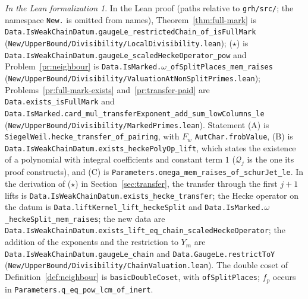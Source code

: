 \documentclass[reqno]{amsart}
\theoremstyle{plain}
\theoremstyle{definition}
\theoremstyle{remark}
\newtheorem*{leanremark}{In the Lean formalization}
\newcommand{\Qc}{\mathcal Q}
\newcommand{\tl}[1]{\texttt{#1}}
\begin{document}
\begin{leanremark}
\begin{sloppypar}
In the Lean proof \cite{GL} (paths relative to \tl{grh/src/}; the namespace \tl{New.} is omitted from names), Theorem~\ref{thm:full-mark} is \tl{Data.IsWeakChainDatum.\allowbreak gaugeLe\_\allowbreak restrictedChain\_\allowbreak of\_\allowbreak isFullMark} (\tl{New/\allowbreak UpperBound/\allowbreak Divisibility/\allowbreak LocalDivisibility.lean}); (\(\star\)) is \tl{Data.IsWeakChainDatum.\allowbreak gaugeLe\_\allowbreak scaledHeckeOperator\_\allowbreak pow} and Problem~\ref{pr:neighbour} is \tl{Data.IsMarked.\allowbreak \(\omega\)\_\allowbreak ofSplitPlaces\_\allowbreak mem\_\allowbreak raises} (\tl{New/\allowbreak UpperBound/\allowbreak Divisibility/\allowbreak ValuationAtNonSplitPrimes.lean}); Problems~\ref{pr:full-mark-exists} and~\ref{pr:transfer-paid} are \tl{Data.exists\_\allowbreak isFullMark} and \tl{Data.IsMarked.\allowbreak card\_\allowbreak mul\_\allowbreak transferExponent\_\allowbreak add\_\allowbreak sum\_\allowbreak lowColumns\_\allowbreak le} (\tl{New/\allowbreak UpperBound/\allowbreak Divisibility/\allowbreak MarkedPrimes.lean}).  Statement (A) is \tl{SiegelWeil.\allowbreak hecke\_\allowbreak transfer\_\allowbreak of\_\allowbreak pairing}, with \(F_w\) \tl{AutChar.frobValue}, (B) is \tl{Data.IsWeakChainDatum.\allowbreak exists\_\allowbreak heckePolyOp\_\allowbreak lift}, which states the existence of a polynomial with integral coefficients and constant term \(1\) (\(\Qc_j\) is the one its proof constructs), and (C) is \tl{Parameters.\allowbreak omega\_\allowbreak mem\_\allowbreak raises\_\allowbreak of\_\allowbreak schurJet\_\allowbreak le}.  In the derivation of (\(\star\)) in Section~\ref{sec:transfer}, the transfer through the first \(j+1\) lifts is \tl{Data.IsWeakChainDatum.\allowbreak exists\_\allowbreak hecke\_\allowbreak transfer}; the Hecke operator on the datum is \tl{Data.liftKernel\_\allowbreak lift\_\allowbreak heckeSplit} and \tl{Data.IsMarked.\allowbreak \(\omega\)\_\allowbreak heckeSplit\_\allowbreak mem\_\allowbreak raises}; the new data are \tl{Data.IsWeakChainDatum.\allowbreak exists\_\allowbreak lift\_\allowbreak eq\_\allowbreak chain\_\allowbreak scaledHeckeOperator}; the addition of the exponents and the restriction to \(Y_m\) are \tl{Data.IsWeakChainDatum.\allowbreak gaugeLe\_\allowbreak chain} and \tl{Data.GaugeLe.\allowbreak restrictToY} (\tl{New/\allowbreak UpperBound/\allowbreak Divisibility/\allowbreak ChainValuation.lean}).  The double coset of Definition~\ref{def:neighbour} is \tl{basicDoubleCoset}, with \tl{ofSplitPlaces}; \(f_p\) occurs in \tl{Parameters.\allowbreak q\_\allowbreak eq\_\allowbreak pow\_\allowbreak lcm\_\allowbreak of\_\allowbreak inert}.
\end{sloppypar}
\end{leanremark}
\end{document}

